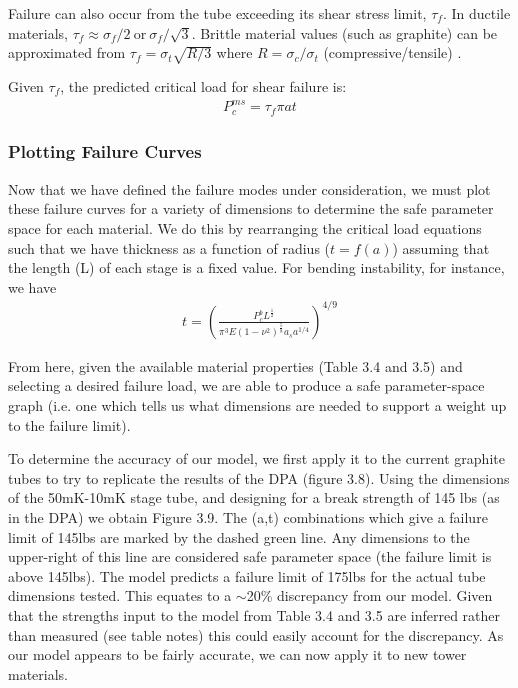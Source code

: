 \documentclass{report}
\begin{document}
Failure can also occur from the tube exceeding its shear stress limit, $\tau_{f}$. In ductile materials, $\tau_{f} \approx \sigma_{f}/2 \ \text{or} \ \sigma_{f}/\sqrt{3}$. Brittle material values (such as graphite) can be approximated from $\tau_{f} = \sigma_{t}\sqrt{R/3} $ where $R = \sigma_{c}/\sigma_{t}$ (compressive/tensile) \cite{Ely1965}.

Given $\tau_{f}$, the predicted critical load for shear failure is:
\begin{eqnarray}
P_{c}^{ms} = \tau_{f}\pi at
\end{eqnarray}

\subsubsection{Plotting Failure Curves}

Now that we have defined the failure modes under consideration, we must plot these failure curves for a variety of dimensions to determine the safe parameter space for each material. We do this by rearranging the critical load equations such that we have thickness as a function of radius ($t = f(a)$) assuming that the length (L) of each stage is a fixed value. For bending instability, for instance, we have
\begin{eqnarray}
t = \left(\frac{P_{c}^b L^\frac{1}{2}}{\pi^3 E (1-\nu^2)^\frac{5}{8}a_s a^{1/4}}\right)^{4/9}
\end{eqnarray}

From here, given the available material properties (Table 3.4 and 3.5) and selecting a desired failure load, we are able to produce a safe parameter-space graph (i.e. one which tells us what dimensions are needed to support a weight up to the failure limit).

To determine the accuracy of our model, we first apply it to the current graphite tubes to try to replicate the results of the DPA (figure 3.8). Using the dimensions of the 50mK-10mK stage tube, and designing for a break strength of 145 lbs (as in the DPA) we obtain Figure 3.9.  The (a,t) combinations which give a failure limit of 145lbs are marked by the dashed green line. Any dimensions to the upper-right of this line are considered safe parameter space (the failure limit is above 145lbs). The model predicts a failure limit of 175lbs for the actual tube dimensions tested. This equates to a $\sim$20\% discrepancy from our model. Given that the strengths input to the model from Table 3.4 and 3.5 are inferred rather than measured (see table notes) this could easily account for the discrepancy. As our model appears to be fairly accurate, we can now apply it to new tower materials.
\end{document}
